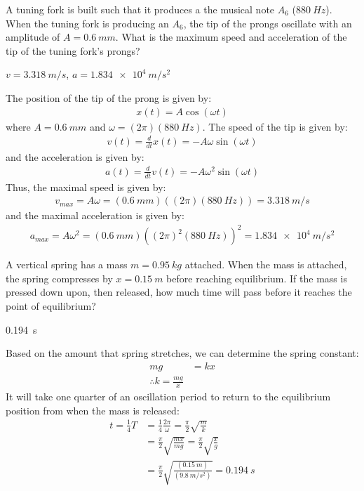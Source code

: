 \question  A tuning fork is built such that it produces a the musical note $A_6$ ($\SI{880}{Hz}$). When the tuning fork is producing an $A_6$, the tip of the prongs oscillate with an amplitude of $A=\SI{0.6}{mm}$. What is the maximum speed and acceleration of the tip of the tuning fork's prongs?
\begin{finalanswer}
	$v = \SI{3.318}{m/s}$,
	$a = \SI{1.834e4}{m/s^2}$
\end{finalanswer}
\begin{solution}
	The position of the tip of the prong is given by:
	\begin{align*}
	x(t) = A\cos(\omega t)
	\end{align*}
	where $A=\SI{0.6}{mm}$ and $\omega = (2\pi)(\SI{880}{Hz})$. The speed of the tip is given by:
	\begin{align*}
	v(t) =\frac{d}{dt}x(t)= -A\omega\sin(\omega t)
	\end{align*}
	and the acceleration is given by:
	\begin{align*}
	a(t) =\frac{d}{dt}v(t)= -A\omega^2\sin(\omega t)
	\end{align*}
	Thus, the maximal speed is given by:
	\begin{align*}
	v_{max}=A\omega=(\SI{0.6}{mm})((2\pi)(\SI{880}{Hz}))=\SI{3.318}{m/s}
	\end{align*}
	and the maximal acceleration is given by:
	\begin{align*}
	a_{max}=A\omega^2=(\SI{0.6}{mm})((2\pi)^2(\SI{880}{Hz}))^2=\SI{1.834e4}{m/s^2}
	\end{align*}
\end{solution}

\question A vertical spring has a mass $m = \SI{0.95}{kg}$ attached. When the mass is attached, the spring compresses by $x = \SI{0.15}{m}$ before reaching equilibrium. If the mass is pressed down upon, then released, how much time will pass before it reaches the point of equilibrium?
\begin{finalanswer}
	\SI{0.194}{s}
\end{finalanswer}
\begin{solution}
	Based on the amount that spring stretches, we can determine the spring constant:
	\begin{align*}
	mg &= kx\\
	\therefore k = \frac{mg}{x}
	\end{align*}
	It will take one quarter of an oscillation period to return to the equilibrium position from when the mass is released:
	\begin{align*}
	t=\frac{1}{4}T&=\frac{1}{4}\frac{2\pi}{\omega}=\frac{\pi}{2}\sqrt{\frac{m}{k}}\\
	&=\frac{\pi}{2}\sqrt{\frac{m x}{mg}}=\frac{\pi}{2}\sqrt{\frac{x}{g}}\\
	&=\frac{\pi}{2}\sqrt{\frac{(\SI{0.15}{m})}{(\SI{9.8}{m/s^2})}}=\SI{0.194}{s}
	\end{align*}
\end{solution}


